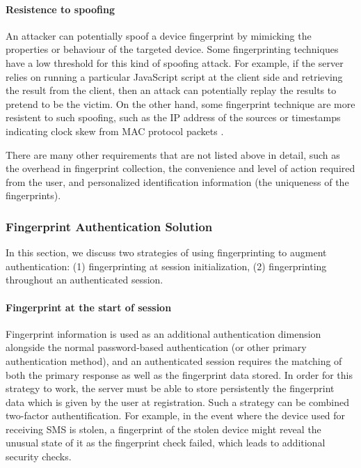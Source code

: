 \documentclass{acm_proc_article-sp}
\begin{document}
\paragraph {Resistence to spoofing}
An attacker can potentially spoof a device fingerprint by mimicking the properties or behaviour of the targeted device. Some fingerprinting techniques  have a low threshold for this kind of spoofing attack. For example, if the server relies on running a particular JavaScript script at the client side and retrieving the result from the client, then an attack can potentially replay the results to pretend to be the victim.
On the other hand, some fingerprint technique are more resistent to such spoofing, such as the IP address of the sources\cite{beverly:ip} or timestamps indicating clock skew from MAC protocol packets \cite{ara:wire}.

There are many other requirements that are not listed above in detail, such as the overhead in fingerprint collection, the convenience and level of action required from the user, and personalized identification information (the uniqueness of the fingerprints).


\subsubsection{Fingerprint Authentication Solution}
In this section, we discuss two strategies of using fingerprinting to augment authentication: (1) fingerprinting at session initialization, (2) fingerprinting throughout an authenticated session. 

\paragraph{Fingerprint at the start of session}
Fingerprint information is used as an additional authentication dimension alongside the normal password-based authentication (or other primary authentication method), and an authenticated session requires the matching of both the primary response as well as the fingerprint data stored.
In order for this strategy to work, the server must be able to store persistently the fingerprint data which is given by the user at registration. 
Such a strategy can be combined two-factor authentification. For example, in the event where the device used for receiving SMS is stolen, a fingerprint of the stolen device might reveal the unusual state of it as the fingerprint check failed, which leads to additional security checks.
\end{document}
